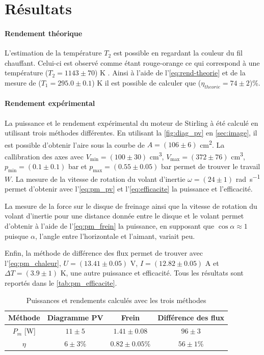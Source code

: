 \section{Résultats}

\paragraph*{Rendement théorique}
L'estimation de la température \(T_2\) est possible en regardant la couleur du fil chauffant. Celui-ci est observé comme étant rouge-orange ce qui correspond à une température (\(T_2 = 1143 \pm 70\)) \si{\kelvin} \cite{temp-fil}. Ainsi à l'aide de l'\autoref{eq:rend-theorie} et de la mesure de (\(T_1 = 295.0 \pm 0.1\)) \si{\kelvin} il est possible de calculer que (\(\eta_{theorie} = 74 \pm2\))\%.

\paragraph*{Rendement expérimental}
La puissance et le rendement expérimental du moteur de Stirling à été calculé en utilisant trois méthodes différentes. En utilisant la \autoref{fig:diag_pv} en \autoref{sec:image}, il est possible d'obtenir l'aire sous la courbe de \(A = (106 \pm 6)\) \si{\centi\meter\squared}. La callibration des axes avec \(V_\textrm{min} = (100 \pm 30)\) \si{\centi\meter\cubed}, \(V_\textrm{max} = (372 \pm 76)\) \si{\centi\meter\cubed}, \(p_\textrm{min} = (0.1 \pm 0.1)\) \si{\bar} et \(p_\textrm{max} = (0.55 \pm 0.05)\) \si{\bar} permet de trouver le travail \(W\). La mesure de la vitesse de rotation du volant d'inertie \(\omega = (24 \pm 1)\) \si{\radian\per\second} permet d'obtenir avec l'\autoref{eq:pm_pv} et l'\autoref{eq:efficacite} la puissance et l'efficacité.

La mesure de la force sur le disque de freinage ainsi que la vitesse de rotation du volant d'inertie pour une distance donnée entre le disque et le volant permet d'obtenir à l'aide de l'\autoref{eq:pm_frein} la puissance, en supposant que \(\cos{\alpha} \approx 1\) puisque \(\alpha\), l'angle entre l'horizontale et l'aimant, variait peu.

Enfin, la méthode de différence des flux permet de trouver avec l'\autoref{eq:pm_chaleur}, \(U = (13.41 \pm 0.05)\) \si{\volt}, \(I = (12.82 \pm 0.05)\) \si{\ampere} et \(\Delta T = (3.9 \pm 1)\) \si{\kelvin}, une autre puissance et efficacité. Tous les résultats sont reportés dans le \autoref{tab:pm_efficacite}.

\begin{table}[h]
    \centering
    \begin{tabulary}{\linewidth}{C C C C}
        \toprule
        Méthode & Diagramme PV & Frein & Différence des flux \\
        \midrule
        \(P_m\) [\si{\watt}] & \(11 \pm 5\) & \(1.41 \pm 0.08\) & \(96 \pm 3\) \\
        \(\eta\) & \(6 \pm 3\)\% & \(0.82 \pm 0.05\)\% & \(56 \pm 1\)\% \\
        \bottomrule
    \end{tabulary}
    \caption{Puissances et rendements calculés avec les trois méthodes}
    \label{tab:pm_efficacite}
\end{table}

